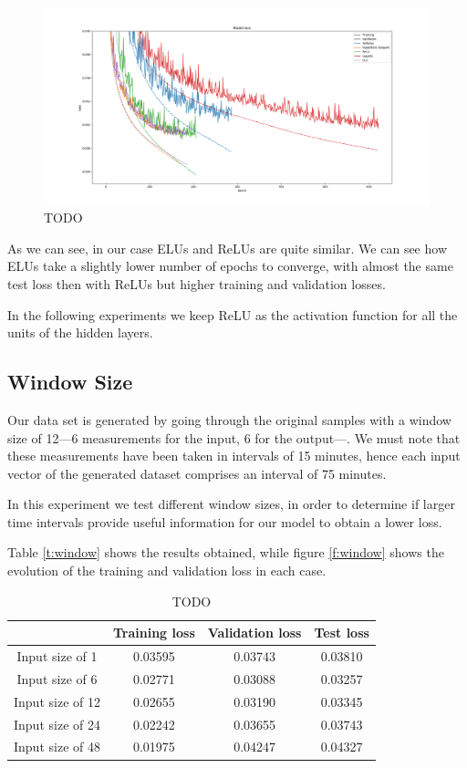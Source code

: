 \documentclass[]{article}
\begin{document}
\begin{figure}[H]
	\centering
	\includegraphics[width=\textwidth]{activation}
	\caption{TODO}
	\label{f:activation}
\end{figure}

As we can see, in our case ELUs and ReLUs are quite similar. We can see how ELUs take a slightly lower number of epochs to converge, with almost the same test loss then with ReLUs but higher training and validation losses.

In the following experiments we keep ReLU as the activation function for all the units of the hidden layers.

\subsection{Window Size}

Our data set is generated by going through the original samples with a window size of 12---6 measurements for the input, 6 for the output---. We must note that these measurements have been taken in intervals of 15 minutes, hence each input vector of the generated dataset comprises an interval of 75 minutes.

In this experiment we test different window sizes, in order to determine if larger time intervals provide useful information for our model to obtain a lower loss.

Table \ref{t:window} shows the results obtained, while figure \ref{f:window} shows the evolution of the training and validation loss in each case.

\begin{table}[H]
	\centering
	\begin{tabular}{@{}cccc@{}}
		\toprule
		& Training loss & Validation loss & Test loss \\ \midrule
		Input size of 1  & 0.03595       & 0.03743         & 0.03810   \\
		Input size of 6  & 0.02771       & 0.03088         & 0.03257   \\
		Input size of 12 & 0.02655       & 0.03190         & 0.03345   \\
		Input size of 24 & 0.02242       & 0.03655         & 0.03743   \\
		Input size of 48 & 0.01975       & 0.04247         & 0.04327   \\ \bottomrule
	\end{tabular}
	\caption{TODO}
	\label{window}
\end{table}
\end{document}
